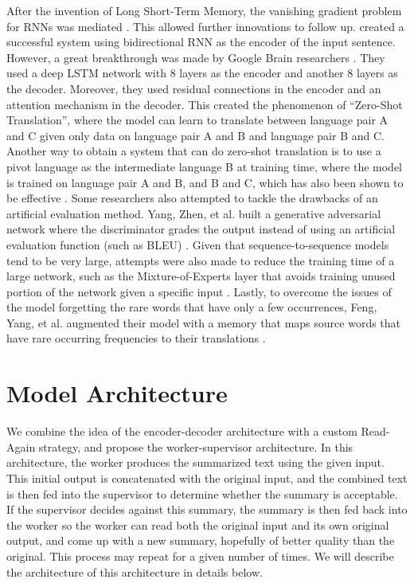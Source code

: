 \documentclass[letterpaper]{article} %
\begin{document}
After the invention of Long Short-Term Memory, the vanishing gradient problem for RNNs was mediated \cite{sutskever2014sequence}. This allowed further innovations to follow up. \cite{bahdanau2014neural} created a successful system using bidirectional RNN as the encoder of the input sentence. However, a great breakthrough was made by Google Brain researchers \cite{johnson2016google}. They used a deep LSTM network with 8 layers as the encoder and another 8 layers as the decoder. Moreover, they used residual connections in the encoder and an attention mechanism in the decoder. This created the phenomenon of “Zero-Shot Translation”, where the model can learn to translate between language pair A and C given only data on language pair A and B and language pair B and C. Another way to obtain a system that can do zero-shot translation is to use a pivot language as the intermediate language B at training time, where the model is trained on language pair A and B, and B and C, which has also been shown to be effective \cite{chen2017teacher}. Some researchers also attempted to tackle the drawbacks of an artificial evaluation method. Yang, Zhen, et al. built a generative adversarial network where the discriminator grades the output instead of using an artificial evaluation function (such as BLEU) \cite{yang2017improving}. Given that sequence-to-sequence models tend to be very large, attempts were also made to reduce the training time of a large network, such as the Mixture-of-Experts layer that avoids training unused portion of the network given a specific input \cite{shazeer2017outrageously}. Lastly, to overcome the issues of the model forgetting the rare words that have only a few occurrences, Feng, Yang, et al. augmented their model with a memory that maps source words that have rare occurring frequencies to their translations \cite{feng2017memory}.

\section{Model Architecture}
We combine the idea of the encoder-decoder architecture with a custom Read-Again strategy, and propose the worker-supervisor architecture. In this architecture, the worker produces the summarized text using the given input. This initial output is concatenated with the original input, and the combined text is then fed into the supervisor to determine whether the summary is acceptable. If the supervisor decides against this summary, the summary is then fed back into the worker so the worker can read both the original input and its own original output, and come up with a new summary, hopefully of better quality than the original. This process may repeat for a given number of times. We will describe the architecture of this architecture in details below.
\end{document}
